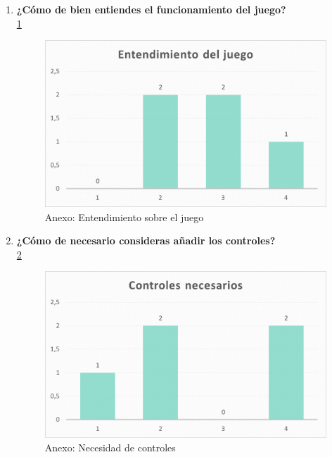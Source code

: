 \documentclass[12pt, a4paper,twoside,titlepage]{book}
\begin{document}
\begin{enumerate}[label=\textbf{\arabic*}.]
     \item \textbf{¿Cómo de bien entiendes el funcionamiento del juego?}\\
	 \ref{fig:anexEnten}
	 \begin{figure}
	 	\centering
	 	\includegraphics[width=.8\linewidth]{Anexo Demo/1AnexDem_enten}
	 	\caption{Anexo: Entendimiento sobre el juego}
	 	\label{fig:anexEnten}
	 \end{figure}
	 \item \textbf{¿Cómo de necesario consideras añadir los controles?}\\
	 \ref{fig:anexControl}
	 	 \begin{figure}
	 	\centering
	 	\includegraphics[width=.8\linewidth]{Anexo Demo/2AnexDem_controles}
	 	\caption{Anexo: Necesidad de controles}
	 	\label{fig:anexControl}
	 \end{figure}
	 

\end{enumerate}
\end{document}
